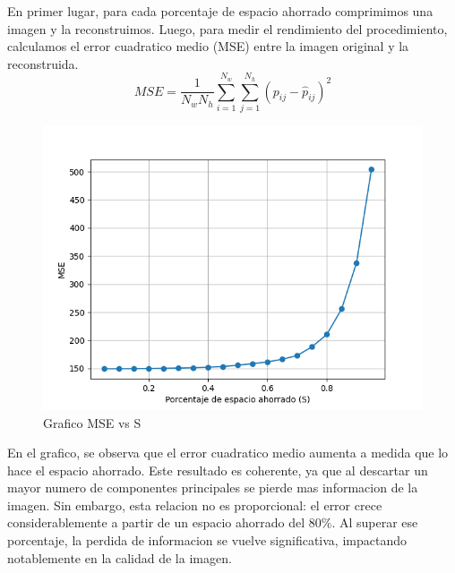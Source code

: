 \documentclass[a4paper,12pt]{article}
\numberwithin{equation}{section}
\numberwithin{figure}{section}
\begin{document}
En primer lugar, para cada porcentaje de espacio ahorrado comprimimos una imagen y la reconstruimos. Luego, para 
medir el rendimiento del procedimiento, calculamos el error cuadratico medio (MSE) entre la imagen original y 
la reconstruida. 
\begin{equation}
MSE = \frac{1}{N_w N_h} \sum_{i=1}^{N_w} \sum_{j=1}^{N_h} (p_{ij} - \hat{p}_{ij})^2
\end{equation}

\begin{figure}[H]
    \centering
    \includegraphics[width=1\textwidth]{Ejercicio 4a.png}
    \caption{Grafico MSE vs S}
    \label{fig:ej4}
\end{figure}

En el grafico, se observa que el error cuadratico medio aumenta a medida que lo hace el espacio ahorrado.
Este resultado es coherente, ya que al descartar un mayor numero de componentes principales se pierde mas 
informacion de la imagen. 
Sin embargo, esta relacion no es proporcional: el error crece considerablemente a partir de un espacio 
ahorrado del 80\%. Al superar ese porcentaje, la perdida de informacion se vuelve significativa, 
impactando notablemente en la calidad de la imagen. 
\end{document}
